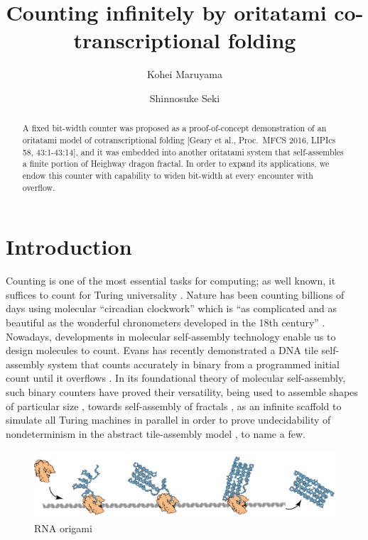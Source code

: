 \documentclass[runningheads]{llncs}
\title{Counting infinitely by oritatami co-transcriptional folding}
\author{
Kohei Maruyama\inst{1}\and
Shinnosuke Seki\inst{1,2}
}
\institute{
The University of Electro-Communications, 
1-5-1 Chofugaoka, Chofu, Tokyo, 1828585, Japan \email{\{k.maruyama, s.seki\}@uec.ac.jp}\and
\'{E}cole Normale Superi\'{e}ure de Lyon, 46 all\'{e}e d'Italie, 69007, Lyon, France
}
\begin{document}
\maketitle

\begin{abstract}
A fixed bit-width counter was proposed as a proof-of-concept demonstration of an oritatami model of cotranscriptional folding [Geary et al., Proc.~MFCS 2016, LIPIcs 58, 43:1-43:14], and it was embedded into another oritatami system that self-assembles a finite portion of Heighway dragon fractal. 
In order to expand its applications, we endow this counter with capability to widen bit-width at every encounter with overflow. 
\end{abstract}

	\section{Introduction}

Counting is one of the most essential tasks for computing; as well known, it suffices to count for Turing universality \cite{Minsky1967}. 
Nature has been counting billions of days using molecular ``circadian clockwork'' which is ``as complicated and as beautiful as the wonderful chronometers developed in the 18th century''  \cite{McClung2006}. 
Nowadays, developments in molecular self-assembly technology enable us to design molecules to count. 
Evans has recently demonstrated a DNA tile self-assembly system that counts accurately in binary from a programmed initial count until it overflows \cite{EvansPhD}. 
In its foundational theory of molecular self-assembly, such binary counters have proved their versatility, being used to assemble shapes of particular size \cite{AdChGoHu2001,RothemundWinfree2000}, towards self-assembly of fractals \cite{MasudaSekiUbukata2018}, as an infinite scaffold to simulate all Turing machines in parallel in order to prove undecidability of nondeterminism in the abstract tile-assembly model \cite{BrChDoKaSe2013}, to name a few. 

\begin{figure}[tb]
\centering
\includegraphics[width=\linewidth]{fig/rna_origami.pdf}
\caption{RNA origami}
\label{fig:rna_origami}
\end{figure}
\end{document}
